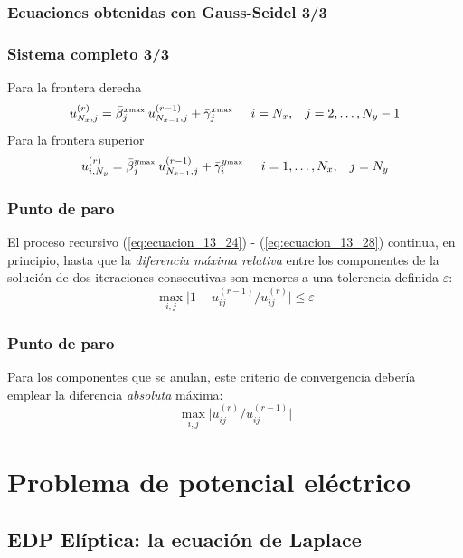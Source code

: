 \documentclass[12pt]{beamer}
\begin{document}
\begin{frame}
\frametitle{Ecuaciones obtenidas con Gauss-Seidel 3/3}
\frametitle{Sistema completo 3/3}
Para la frontera derecha
\begin{equation}
u_{N_{x},j}^{(r)} = \bar{\beta}_{j}^{x {\text{\tiny{max}}}} \:  u_{N_{x-1}, j}^{(r-1)} + \bar{\gamma}_{j}^{x {\text{\tiny{max}}}} \hspace{0.5cm} i = N_{x}, \hspace{0.3cm} j = 2, \ldots, N_{y} - 1
\label{eq:ecuacion_13_27}
\end{equation}
\pause
Para la frontera superior
\begin{equation}
u_{i, N_{y}}^{(r)} = \bar{\beta}_{j}^{y {\text{\tiny{max}}}} \:  u_{N_{x-1}, j}^{(r-1)} + \bar{\gamma}_{i}^{y {\text{\tiny{max}}}} \hspace{0.5cm} i = 1, \ldots, N_{x}, \hspace{0.3cm} j = N_{y}
\label{eq:ecuacion_13_28}
\end{equation}
\end{frame}
\begin{frame}
\frametitle{Punto de paro}
El proceso recursivo (\ref{eq:ecuacion_13_24}) - (\ref{eq:ecuacion_13_28}) continua, en principio, hasta que la \emph{diferencia máxima relativa} entre los componentes de la solución de dos iteraciones consecutivas son menores a una tolerencia definida $\varepsilon$:     
\begin{equation}
\max_{i,j} \vert 1 - u_{ij}^{(r-1)} / u_{ij}^{(r)} \vert \leq \varepsilon
\label{eq:ecuacion_13_29}
\end{equation}
\end{frame}
\begin{frame}
\frametitle{Punto de paro}
Para los componentes que se anulan, este criterio de convergencia debería emplear la diferencia \emph{absoluta} máxima:
\[ \max_{i,j} \vert u_{ij}^{(r)} / u_{ij}^{(r-1)} \vert \]
\end{frame}

\section{Problema de potencial eléctrico}
\subsection{EDP Elíptica: la ecuación de Laplace}
\end{document}
